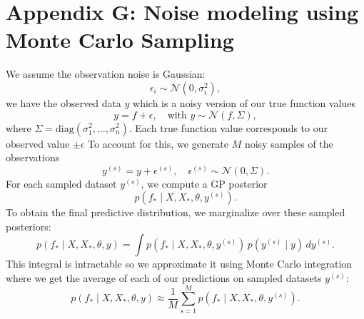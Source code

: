 \documentclass[12pt]{article}
\begin{document}
\section{Appendix G: Noise modeling using Monte Carlo Sampling}
\label{appendix:monte_carlo}

We assume the observation noise is Gaussian:
\[
\epsilon_i \sim \mathcal{N}(0, \sigma_i^2),
\]
we have the observed data \( y \) which is a noisy version of our true function values
\[
y = f + \epsilon, \quad \text{with } y \sim \mathcal{N}(f, \Sigma),
\]
where \( \Sigma = \mathrm{diag}(\sigma_1^2, \dots, \sigma_n^2) \).
Each true function value corresponds to our observed value \(\pm \epsilon\)
To account for this, we generate \( M \) noisy samples of the observations
\begin{equation}
    y^{(s)} = y + \epsilon^{(s)}, \quad \epsilon^{(s)} \sim \mathcal{N}(0, \Sigma).
\end{equation}
For each sampled dataset \( y^{(s)} \), we compute a GP posterior
\begin{equation}
    p(f_* \mid X, X_*, \theta, y^{(s)}).
\end{equation}
To obtain the final predictive distribution, we marginalize over these sampled posteriors:
\begin{equation}
    p(f_* \mid X, X_*, \theta, y) = \int p(f_* \mid X, X_*, \theta, y^{(s)}) \, p(y^{(s)} \mid y) \, dy^{(s)}.
\end{equation}
This integral is intractable so we approximate it using Monte Carlo integration where we get the average of each of our predictions on sampled datasets \(y^{(s)}\):
\begin{equation}
    p(f_* \mid X, X_*, \theta, y) \approx \frac{1}{M} \sum_{s=1}^{M} p(f_* \mid X, X_*, \theta, y^{(s)}).
\end{equation}

% 
% 
 
\end{document}
